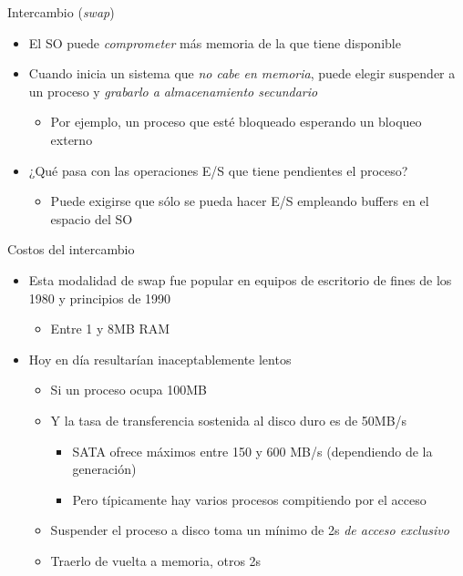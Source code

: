 \documentclass[presentation]{beamer}
\begin{document}
\begin{frame}[label={sec:orgb926421}]{Intercambio (\emph{swap})}
\begin{itemize}
\item El SO puede \emph{comprometer} más memoria de la que tiene disponible
\item Cuando inicia un sistema que \emph{no cabe en memoria}, puede elegir
suspender a un proceso y \emph{grabarlo a almacenamiento secundario}
\begin{itemize}
\item Por ejemplo, un proceso que esté bloqueado esperando un bloqueo
externo
\end{itemize}
\item ¿Qué pasa con las operaciones E/S que tiene pendientes el proceso?
\begin{itemize}
\item Puede exigirse que sólo se pueda hacer E/S empleando buffers en
el espacio del SO
\end{itemize}
\end{itemize}
\end{frame}

\begin{frame}[label={sec:org6f9e4ba}]{Costos del intercambio}
\begin{itemize}
\item Esta modalidad de swap fue popular en equipos de escritorio de
fines de los 1980 y principios de 1990
\begin{itemize}
\item Entre 1 y 8MB RAM
\end{itemize}
\item Hoy en día resultarían inaceptablemente lentos
\begin{itemize}
\item Si un proceso ocupa 100MB
\item Y la tasa de transferencia sostenida al disco duro es de 50MB/s
\begin{itemize}
\item SATA ofrece máximos entre 150 y 600 MB/s (dependiendo de la
generación)
\item Pero típicamente hay varios procesos compitiendo por el acceso
\end{itemize}
\item Suspender el proceso a disco toma un mínimo de 2s \emph{de acceso
exclusivo}
\item Traerlo de vuelta a memoria, otros 2s
\end{itemize}
\end{itemize}
\end{frame}
\end{document}
